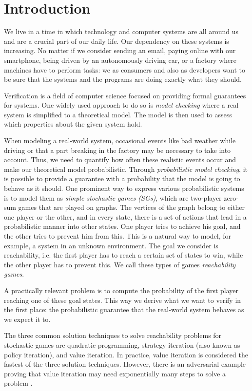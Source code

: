 \chapter{Introduction} \label{ch:intro}

We live in a time in which technology and computer systems are all around us and are a crucial part of our daily life. 
Our dependency on these systems is increasing. 
No matter if we consider sending an email, paying online with our smartphone, being driven by an autonomously driving car, or a factory where machines have to perform tasks: 
we as consumers and also as developers want to be sure that the systems and the programs are doing exactly what they should.

Verification is a field of computer science focused on providing formal guarantees for systems. 
One widely used approach to do so is \emph{model checking} where a real system is simplified to a theoretical model.
The model is then used to assess which properties about the given system hold.

When modeling a real-world system, occasional events like bad weather while driving or that a part breaking in the factory may be necessary to take into account. 
Thus, we need to quantify how often these realistic events occur and make our theoretical model probabilistic. 
Through \emph{probabilistic model checking}, it is possible to provide a guarantee with a probability that the model is going to behave as it should. 
One prominent way to express various probabilistic systems is to model them as \emph{simple stochastic games (SGs)}, which are two-player zero-sum games that are played on graphs. 
The vertices of the graph belong to either one player or the other, and in every state, there is a set of actions that lead in a probabilistic manner into other states. 
One player tries to achieve his goal, and the other tries to prevent him from this. This is a natural way to model, for example, a system in an unknown environment.
The goal we consider is reachability, i.e. the first player has to reach a certain set of states to win, while the other player has to prevent this. 
We call these types of games \emph{reachability games}.

A practically relevant problem is to compute the probability of the first player reaching one of these goal states. 
This way we derive what we want to verify in the first place: 
the probabilistic guarantee that the real-world system behaves as we expect it to.

The three common solution techniques to solve reachability problems for stochastic games are quadratic programming, 
strategy iteration (also known as policy iteration), and value iteration.
In practice, value iteration is considered the fastest of the three solution techniques.
However, there is an adversarial example proving that value iteration may need exponentially many steps to solve a problem \cite{viExponential}.


